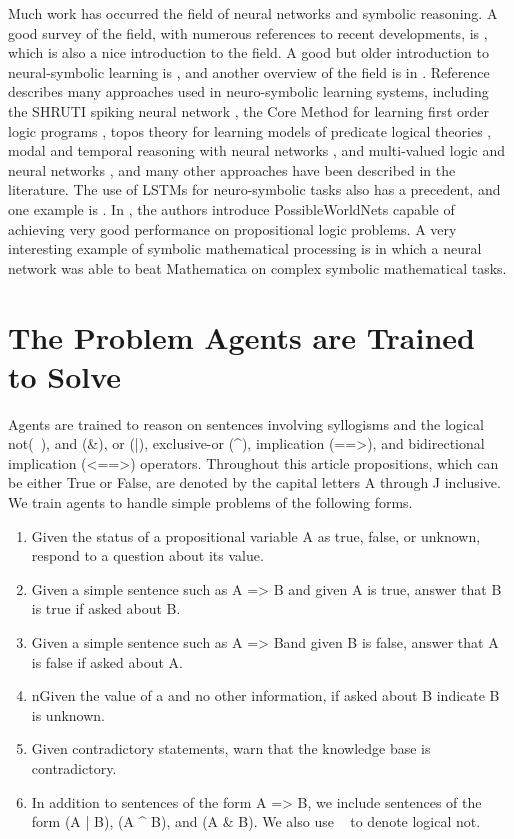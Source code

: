 \documentclass{article}
\begin{document}
Much work has occurred the field of neural networks and symbolic reasoning.
A good survey of the field, with numerous references to recent developments, is
\cite{DBLP:journals/corr/abs-1711-03902}, which is also a nice introduction to
the field.
A good but older introduction to neural-symbolic learning is \cite{neural_symbolic_2002},
and another overview of the field is in
\cite{bica2015_integrated_neural_symbolic}.
Reference
\cite{neural_symbolic_2007} describes many approaches used in neuro-symbolic
learning systems, including the SHRUTI spiking neural network
\cite{shruti_2007}, the Core Method for learning first order logic programs
\cite{core_method_2007}, topos theory for learning models of
predicate logical theories \cite{topos_theory_2007}, modal and temporal
reasoning with neural networks \cite{modal_temporal_2007}, and multi-valued
logic and neural networks \cite{multi_valued_logic_2007}, and many other
approaches have been described in the literature.  The use of LSTMs for
neuro-symbolic tasks also has a precedent,
and one example is \cite{captcha_2017}.
In \cite{possible_worlds}, the authors introduce PossibleWorldNets
capable of achieving very good performance on propositional logic problems.
A very interesting example of symbolic mathematical processing 
is \cite{microsoft_research_symbolic_math} in which a neural network
was able to beat Mathematica on complex symbolic mathematical tasks.

\section{The Problem Agents are Trained to Solve}

Agents are trained to reason on sentences involving syllogisms and the logical not(~), and (\&), or (|), exclusive-or (^), implication (==>), and bidirectional implication (<==>) operators. Throughout this article propositions, which can be either True or False, are denoted by the capital letters A through J inclusive. We train agents to handle simple problems of the following forms.

\begin{enumerate}
	\item Given the status of a propositional variable A as true, false, or unknown, respond to a question about its value.
	\item Given a simple sentence such as A => B and given A is true, answer that B is true if asked about B.
	\item Given a simple sentence such as A => Band given B is false, answer that A is false if asked about A.
	\item nGiven the value of a and no other information, if asked about B indicate B is unknown.
	\item Given contradictory statements, warn that the knowledge base is contradictory.
	\item In addition to sentences of the form A => B, we include sentences of the form (A | B), (A ^ B), and (A & B). We also use ~ to denote logical not.
\end{enumerate}
\end{document}
